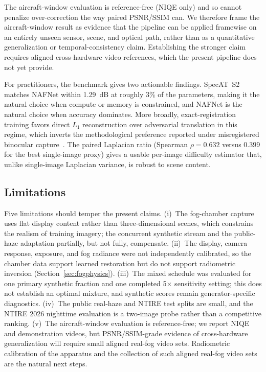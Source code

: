 \documentclass{optica-article}
\begin{document}
The aircraft-window evaluation is reference-free (NIQE only) and so
cannot penalize over-correction the way paired PSNR/SSIM can. We
therefore frame the
aircraft-window result as evidence that the pipeline can be applied
framewise on an entirely unseen sensor, scene, and optical path,
rather than as a quantitative generalization or temporal-consistency
claim. Establishing the stronger claim requires aligned
cross-hardware video references, which the present pipeline does not
yet provide.

For practitioners, the benchmark gives two actionable findings.
SpecAT~S2 matches NAFNet within 1.29~dB at roughly 3\% of the
parameters, making it the natural choice when compute or memory is
constrained, and NAFNet is the natural choice when accuracy
dominates. More broadly, exact-registration training favors direct
$L_1$ reconstruction over adversarial translation in this regime,
which inverts the methodological preference reported under
misregistered binocular capture~\cite{pollak2024stereofog}. The
paired Laplacian ratio (Spearman $\rho = 0.632$ versus $0.399$ for
the best single-image proxy) gives a usable per-image difficulty
estimator that, unlike single-image Laplacian variance, is robust
to scene content.

\subsection{Limitations}
\label{sec:limitations}
Five limitations should temper the present claims. (i)~The
fog-chamber capture uses flat display content rather than
three-dimensional scenes, which constrains the realism of training
imagery; the concurrent synthetic stream and the public-haze adaptation
partially, but not fully, compensate. (ii)~The display, camera
response, exposure, and fog radiance were not independently
calibrated, so the chamber data support learned restoration but do
not support radiometric inversion (Section~\ref{sec:fogphysics}).
(iii)~The mixed schedule was evaluated for one primary synthetic
fraction and one completed 5$\times$ sensitivity setting; this does
not establish an optimal mixture, and synthetic scores remain
generator-specific diagnostics. (iv)~The public real-haze and NTIRE
test splits are small, and
the NTIRE 2026 nighttime evaluation is a two-image probe rather
than a competitive ranking. (v)~The aircraft-window evaluation
is reference-free; we report NIQE and demonstration videos, but
PSNR/SSIM-grade evidence of cross-hardware generalization will
require small aligned real-fog video sets. Radiometric calibration
of the apparatus and the collection of such aligned real-fog video
sets are the natural next steps.
 
\end{document}
